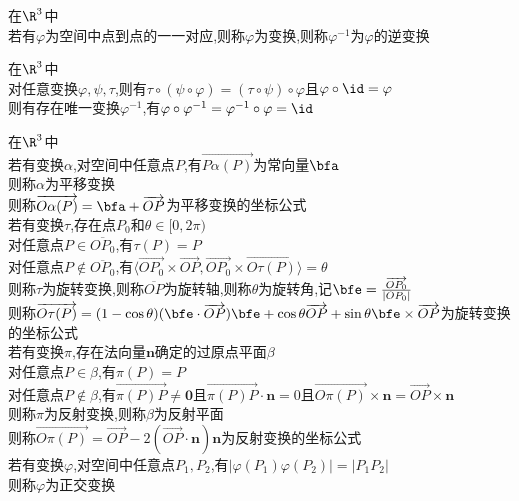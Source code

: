 \begin{dingyi}
在$\R^3$中\\
若有$\varphi$为空间中点到点的一一对应,则称$\varphi$为变换,则称$\varphi^{-1}$为$\varphi$的逆变换
\end{dingyi}

\begin{dingli}
在$\R^3$中\\
对任意变换$\varphi,\psi,\tau$,则有$\tau\circ(\psi\circ\varphi)=(\tau\circ\psi)\circ\varphi$且$\varphi\circ\id=\varphi$\\
则有存在唯一变换$\varphi^{-1}$,有$\varphi\circ\varphi^{-1}=\varphi^{-1}\circ\varphi=\id$
\end{dingli}

\begin{dingyi}
在$\R^3$中\\
若有变换$\alpha$,对空间中任意点$P$,有$\overrightarrow{P\alpha(P)}$为常向量$\bfa$\\
则称$\alpha$为平移变换\\
则称$\overrightarrow{O\alpha(P)}=\bfa+\overrightarrow{OP}$为平移变换的坐标公式\\
若有变换$\tau$,存在点$P_0$和$\theta\in[0,2\pi)$\\
对任意点$P\in\overline{OP_0}$,有$\tau(P)=P$\\
对任意点$P\notin\overline{OP_0}$,有$\langle\overrightarrow{OP_0}\times\overrightarrow{OP},\overrightarrow{OP_0}\times\overrightarrow{O\tau(P)}\rangle=\theta$\\
则称$\tau$为旋转变换,则称$\overline{OP}$为旋转轴,则称$\theta$为旋转角,记$\bfe=\frac{\overrightarrow{OP_0}}{|OP_0|}$\\
则称$\overrightarrow{O\tau(P)}=(1-\cos\theta)(\bfe\cdot\overrightarrow{OP})\bfe+\cos\theta\overrightarrow{OP}+\sin\theta\bfe\times\overrightarrow{OP}$为旋转变换的坐标公式\\
若有变换$\pi$,存在法向量$\mathbf{n}$确定的过原点平面$\beta$\\
对任意点$P\in\beta$,有$\pi(P)=P$\\
对任意点$P\notin\beta$,有$\overrightarrow{\pi(P)P}\neq\mathbf{0}$且$\overrightarrow{\pi(P)P}\cdot\mathbf{n}=0$且$\overrightarrow{O\pi(P)}\times\mathbf{n}=\overrightarrow{OP}\times\mathbf{n}$\\
则称$\pi$为反射变换,则称$\beta$为反射平面\\
则称$\overrightarrow{O\pi(P)}=\overrightarrow{OP}-2(\overrightarrow{OP}\cdot\mathbf{n})\mathbf{n}$为反射变换的坐标公式\\
若有变换$\varphi$,对空间中任意点$P_1,P_2$,有$|\varphi(P_1)\varphi(P_2)|=|P_1P_2|$\\
则称$\varphi$为正交变换
\end{dingyi}

